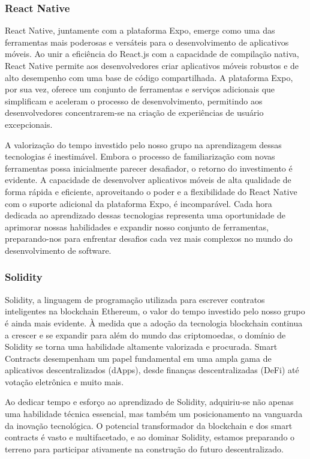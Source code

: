 \documentclass[10pt]{article}
\begin{document}
\subsubsection*{React Native}

React Native, juntamente com a plataforma Expo, emerge como uma das ferramentas mais poderosas e versáteis para o desenvolvimento de aplicativos móveis. Ao unir a eficiência do React.js com a capacidade de compilação nativa, React Native permite aos desenvolvedores criar aplicativos móveis robustos e de alto desempenho com uma base de código compartilhada. A plataforma Expo, por sua vez, oferece um conjunto de ferramentas e serviços adicionais que simplificam e aceleram o processo de desenvolvimento, permitindo aos desenvolvedores concentrarem-se na criação de experiências de usuário excepcionais.

A valorização do tempo investido pelo nosso grupo na aprendizagem dessas tecnologias é inestimável. Embora o processo de familiarização com novas ferramentas possa inicialmente parecer desafiador, o retorno do investimento é evidente. A capacidade de desenvolver aplicativos móveis de alta qualidade de forma rápida e eficiente, aproveitando o poder e a flexibilidade do React Native com o suporte adicional da plataforma Expo, é incomparável. Cada hora dedicada ao aprendizado dessas tecnologias representa uma oportunidade de aprimorar nossas habilidades e expandir nosso conjunto de ferramentas, preparando-nos para enfrentar desafios cada vez mais complexos no mundo do desenvolvimento de software.

\subsubsection*{Solidity}

Solidity, a linguagem de programação utilizada para escrever contratos inteligentes na blockchain Ethereum, o valor do tempo investido pelo nosso grupo é ainda mais evidente. À medida que a adoção da tecnologia blockchain continua a crescer e se expandir para além do mundo das criptomoedas, o domínio de Solidity se torna uma habilidade altamente valorizada e procurada. Smart Contracts desempenham um papel fundamental em uma ampla gama de aplicativos descentralizados (dApps), desde finanças descentralizadas (DeFi) até votação eletrônica e muito mais.

Ao dedicar tempo e esforço ao aprendizado de Solidity, adquiriu-se não apenas uma habilidade técnica essencial, mas também um posicionamento na vanguarda da inovação tecnológica. O potencial transformador da blockchain e dos smart contracts é vasto e multifacetado, e ao dominar Solidity, estamos preparando o terreno para participar ativamente na construção do futuro descentralizado.
\end{document}
